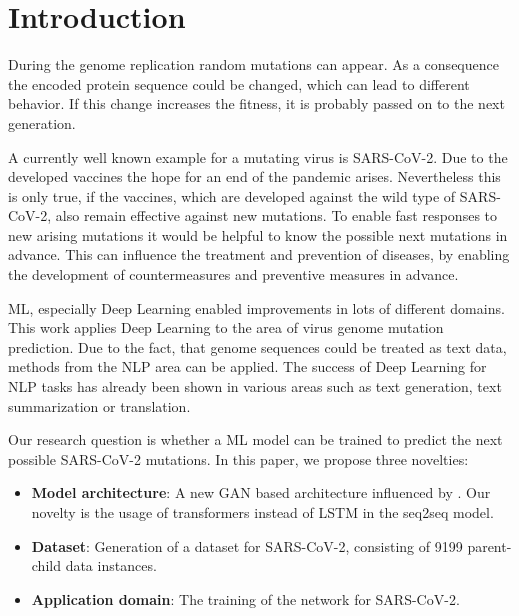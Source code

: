 \section{Introduction}  \label{introduction}


During the genome replication random mutations can appear. As a con\-se\-quence the encoded protein sequence could be changed, which can lead to different behavior. If this change increases the fitness, it is probably passed on to the next generation. \cite{Berman2020}

A currently well known example for a mutating virus is \ac{SARS-CoV-2}. Due to the developed vaccines the hope for an end of the pandemic arises. Nevertheless this is only true, if the vaccines, which are developed against the wild type of \ac{SARS-CoV-2}, also remain effective against new mutations. To enable fast responses to new arising mutations it would be helpful to know the possible next mutations in advance. This can influence the treatment and prevention of diseases, by enabling the development of countermeasures and preventive measures in advance. \cite{Berman2020}

\ac{ML}, especially Deep Learning enabled improvements in lots of different domains. This work applies Deep Learning to the area of virus genome mutation prediction. Due to the fact, that genome sequences could be treated as text data, methods from the \ac{NLP} area can be applied. The success of Deep Learning for \ac{NLP} tasks has already been shown in various areas such as text generation, text sum\-ma\-riza\-t\-ion or translation. \cite{Berman2020}

Our research question is whether a \ac{ML} model can be trained to predict the next possible \ac{SARS-CoV-2} mutations. In this paper, we propose three novelties:
\begin{itemize}
	\item \textbf{Model architecture}: A new \ac{GAN} based architecture influenced by \cite{Berman2020}. Our novelty is the usage of trans\-for\-mers instead of \ac{LSTM} in the seq2seq model.
	\item \textbf{Dataset}: Generation of a dataset for \ac{SARS-CoV-2}, consisting of 9199 parent-child data instances. %
	\item \textbf{Application domain}: The training of the network for \ac{SARS-CoV-2}.
\end{itemize}

\newpage
